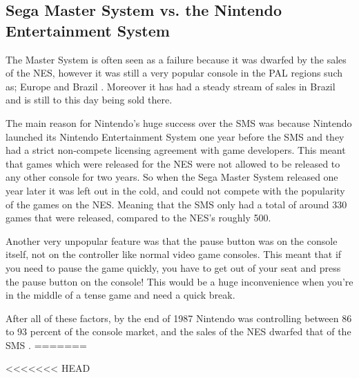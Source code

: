 \documentclass{scrartcl}
\begin{document}
\subsection{Sega Master System vs. the Nintendo Entertainment System} 

The Master System is often seen as a failure because it was dwarfed by the sales of the NES, however it was still a very popular console in the PAL regions such as; Europe and Brazil \cite{Weiss2009}. Moreover it has had a steady stream of sales in Brazil and is still to this day being sold there. \cite{Kent2001}

The main reason for Nintendo's huge success over the SMS was because Nintendo launched its Nintendo Entertainment System one year before the SMS and they had a strict non-compete licensing agreement with game developers. This meant that games which were released for the NES were not allowed to be released to any other console for two years.\cite{Weiss2009} So when the Sega Master System released one year later it was left out in the cold, and could not compete with the popularity of the games on the NES. Meaning that the SMS only had a total of around 330 games that were released, compared to the NES's roughly 500. \cite{russell}

Another very unpopular feature was that the pause button was on the console itself, not on the controller like normal video game consoles. This meant that if you need to pause the game quickly, you have to get out of your seat and press the pause button on the console! This would be a huge inconvenience when you're in the middle of a tense game and need a quick break.\cite{Weiss2009}

After all of these factors, by the end of 1987 Nintendo was controlling between 86 to 93 percent of the console market, and the sales of the NES dwarfed that of the SMS .\cite{Kent2001}
=======



<<<<<<< HEAD

\end{document}
